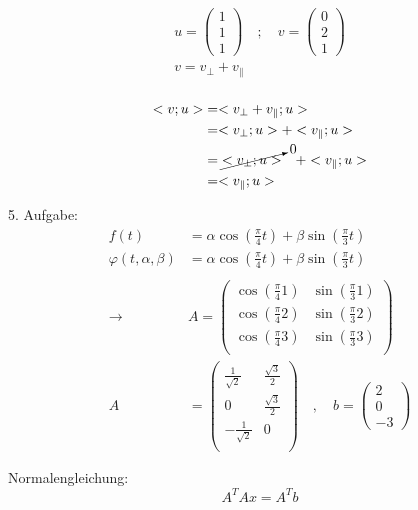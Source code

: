 \begin{equation}\begin{split}
u = \begin{pmatrix*}1\\1\\1\end{pmatrix*}\quad;\quad
v = \begin{pmatrix*}0\\2\\1\end{pmatrix*}\\
v = v_{\bot} + v_{\parallel}\\\\
\end{split}\end{equation}
\begin{equation}\begin{split}
<v; u>
&= <v_{\bot} + v_{\parallel}; u>\\
&= <v_{\bot}; u> + <v_{\parallel}; u>\\
&= \cancelto{0}{<v_{\bot}; u>} \quad + <v_{\parallel}; u>\\
&= <v_{\parallel}; u>\\
\end{split}\end{equation}


5. Aufgabe:
\begin{equation}\begin{split}
f(t) &= \alpha \cos\left(\frac{\pi}{4}t\right) + \beta \sin\left(\frac{\pi}{3}t\right) \\
\varphi(t, \alpha, \beta) &= \alpha \cos\left(\frac{\pi}{4}t\right) + \beta \sin\left(\frac{\pi}{3}t\right)\\\\
\rightarrow & 
A = 
\begin{pmatrix*}
\cos\left(\frac{\pi}{4}1\right) & \sin\left(\frac{\pi}{3}1\right)\\
\cos\left(\frac{\pi}{4}2\right) & \sin\left(\frac{\pi}{3}2\right)\\
\cos\left(\frac{\pi}{4}3\right) & \sin\left(\frac{\pi}{3}3\right)\\		
\end{pmatrix*}\\
A &= 
\begin{pmatrix*}
\frac{1}{\sqrt{2}}  & \frac{\sqrt{3}}{2}\\
0                   & \frac{\sqrt{3}}{2}\\
-\frac{1}{\sqrt{2}} & 0\\		
\end{pmatrix*}
\quad, \quad
b = 
\begin{pmatrix*}
2\\
0\\
-3
\end{pmatrix*}
\end{split}\end{equation}

Normalengleichung:
\[
A^T A x = A^T b
\]


